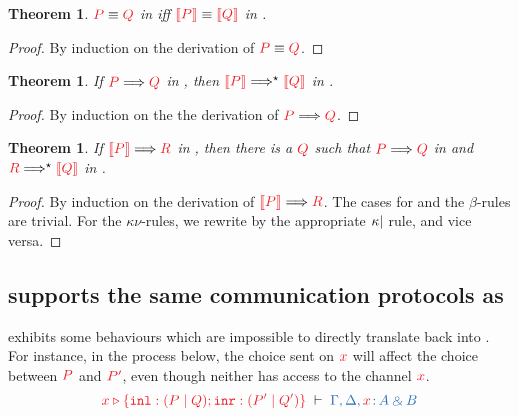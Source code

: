 \documentclass[submission,copyright,creativecommons]{eptcs}
\newtheorem{theorem}[lemma]{Theorem}
\begin{document}
\begin{theorem}\label{thm:cp2hcp-equiv}
  $\tm{P}\equiv\tm{Q}$ in \cp iff $\tm{\mtf{P}}\equiv\tm{\mtf{Q}}$ in \hcp.
\end{theorem}\vspace*{-0.75\baselineskip}%
\begin{proof}
  By induction on the derivation of $\tm{P}\equiv\tm{Q}$.
\end{proof}%
\begin{theorem}\label{thm:cp2hcp-reduction}
  If $\reducesto{P}{Q}$ in \cp, then $\tm{\mtf{P}}\Longrightarrow^\star\tm{\mtf{Q}}$ in \hcp.
\end{theorem}\vspace*{-0.75\baselineskip}%
\begin{proof}
  By induction on the the derivation of $\reducesto{P}{Q}$.
\end{proof}%
\begin{theorem}\label{hcp2cp-reduction}
  If $\reducesto{\mtf{P}}{R}$ in \hcp, then there is a $\tm{Q}$ such that $\reducesto{P}{Q}$ in \cp and $\tm{R}\Longrightarrow^\star\tm{\mtf{Q}}$ in \hcp.
\end{theorem}\vspace*{-0.75\baselineskip}%
\begin{proof}
  By induction on the derivation of $\reducesto{\mtf{P}}{R}$. The cases for  and the $\beta$-rules are trivial. For the $\kappa\nu$-rules, we rewrite by the appropriate $\kappa{\ensuremath{\mid}}$ rule, and vice versa.
\end{proof}\noindent

\subsection{\hcp supports the same communication protocols as \cp}
\hcp exhibits some behaviours which are impossible to directly translate back into \cp. For instance, in the process below, the choice sent on $\tm{x}$ will affect the choice between $\tm{P}$ and $\tm{P'}$, even though neither has access to the channel $\tm{x}$.
\[
  \seq[\cpCase{x}{(\piPar{P}{Q})}{(\piPar{P'}{Q'})}]{
    \Gamma, \Delta, \tmty{x}{A \with B}}
\]
\end{document}
